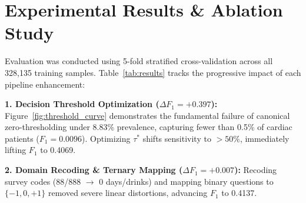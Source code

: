 \documentclass[10pt,conference,compsocconf]{IEEEtran}
\begin{document}
\begin{table}[t]
  \caption{5-Fold Stratified Cross-Validation on BRFSS Dataset}
  \label{tab:results}
  \centering
\end{table}

\section{Experimental Results \& Ablation Study}
\label{sec:results}

Evaluation was conducted using 5-fold stratified cross-validation across all 328,135 training samples. Table~\ref{tab:results} tracks the progressive impact of each pipeline enhancement:

\textbf{1. Decision Threshold Optimization ($\Delta F_1 = +0.397$):} Figure~\ref{fig:threshold_curve} demonstrates the fundamental failure of canonical zero-thresholding under 8.83\% prevalence, capturing fewer than 0.5\% of cardiac patients ($F_1 = 0.0096$). Optimizing $\tau^*$ shifts sensitivity to $>50\%$, immediately lifting $F_1$ to 0.4069.

\textbf{2. Domain Recoding \& Ternary Mapping ($\Delta F_1 = +0.007$):} Recoding survey codes (88/888 $\to$ 0 days/drinks) and mapping binary questions to $\{-1, 0, +1\}$ removed severe linear distortions, advancing $F_1$ to 0.4137.
\end{document}
